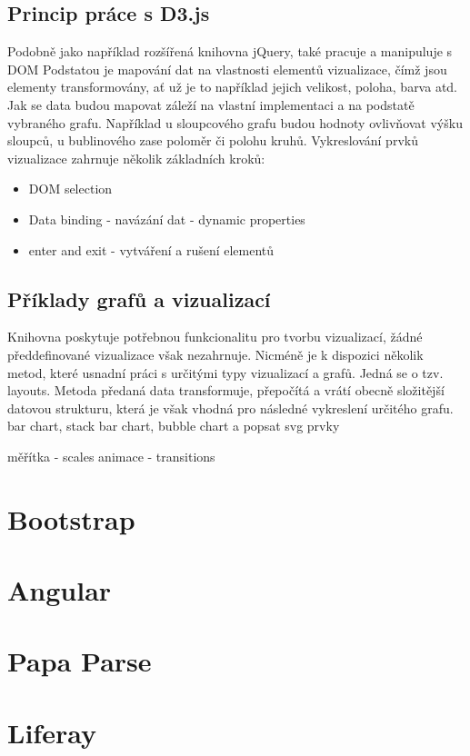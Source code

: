 \documentclass[
  digital, %
  oneside, %
  table,   %
  nolof,     %
  nolot,     %
]{fithesis3}
\begin{document}
\subsection{Princip práce s D3.js}
Podobně jako například rozšířená knihovna jQuery, také pracuje a manipuluje s DOM
Podstatou je mapování dat na vlastnosti elementů vizualizace, čímž jsou elementy transformovány, ať už je to například jejich velikost, poloha, barva atd. Jak se data budou mapovat záleží na vlastní implementaci a na podstatě vybraného grafu. Například u sloupcového grafu budou hodnoty ovlivňovat výšku sloupců, u bublinového zase poloměr či polohu kruhů.
Vykreslování prvků vizualizace zahrnuje několik základních kroků:
\begin{itemize}
  \item DOM selection
  \item Data binding - navázání dat - dynamic properties
  \item enter and exit - vytváření a rušení elementů
\end{itemize}

\subsection{Příklady grafů a vizualizací}
Knihovna poskytuje potřebnou funkcionalitu pro tvorbu vizualizací, žádné předdefinované vizualizace však nezahrnuje. Nicméně je k dispozici několik metod, které usnadní práci s určitými typy vizualizací a grafů. Jedná se o tzv. layouts. Metoda předaná data transformuje, přepočítá a vrátí obecně složitější datovou strukturu, která je však vhodná pro následné vykreslení určitého grafu.
bar chart, stack bar chart, bubble chart a popsat svg prvky


měřítka - scales
animace - transitions

\section{Bootstrap}
\section{Angular}
\section{Papa Parse}
\section{Liferay}
\end{document}
